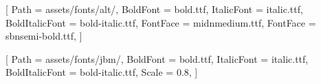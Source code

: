 \newfontfamily{}[
    Path = assets/fonts/alt/,
    BoldFont = bold.ttf,
    ItalicFont = italic.ttf,
    BoldItalicFont = bold-italic.ttf,
    FontFace = {mid}{n}{medium.ttf},
    FontFace = {sb}{n}{semi-bold.ttf},
]

\newfontfamily{}[
    Path = assets/fonts/jbm/,
    BoldFont = bold.ttf,
    ItalicFont = italic.ttf,
    BoldItalicFont = bold-italic.ttf,
    Scale = 0.8,
]
